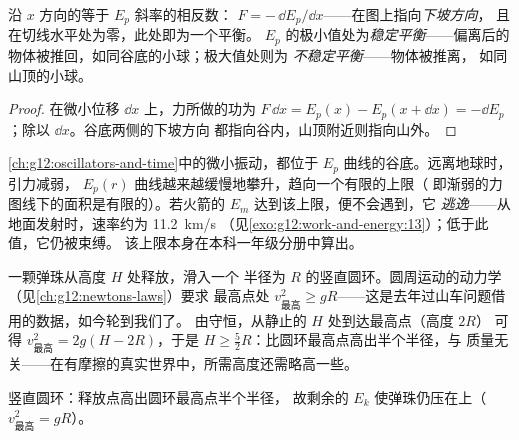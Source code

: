 \begin{proposition}[由势能曲线得力；平衡]\label{prop:g12:work-and-energy:equilibria}
沿 $x$ 方向的等于 $E_p$ 斜率的相反数：
$F = -\,\dd E_p/\dd x$——在图上指向\emph{下坡方向}，
且在切线水平处为零，此处即为一个平衡。
$E_p$ 的极小值处为\emph{稳定平衡}——偏离后的
物体被推回，如同谷底的小球；极大值处则为
\emph{不稳定平衡}——物体被推离，
如同山顶的小球。
\end{proposition}

\begin{proof}
在微小位移 $\dd x$ 上，力所做的功为 $F\,\dd x = E_p(x) -
E_p(x + \dd x) = -\dd E_p$；除以 $\dd x$。谷底两侧的下坡方向
都指向谷内，山顶附近则指向山外。
\end{proof}

\begin{remark}[振动与逃逸]\label{rem:g12:work-and-energy:escape}
\cref{ch:g12:oscillators-and-time}中的微小振动，都位于
$E_p$ 曲线的谷底。远离地球时，引力减弱，
$E_p(r)$ 曲线越来越缓慢地攀升，趋向一个有限的上限（
即渐弱的力图线下的面积是有限的）。若火箭的 $E_m$
达到该上限，便不会遇到，它
\emph{逃逸}——从地面发射时，速率约为 \qty{11.2}{km/s}
（见\cref{exo:g12:work-and-energy:13}）；低于此值，它仍被束缚。
该上限本身在本科一年级分册中算出。
\end{remark}

\begin{example}[竖直圆环]\label{ex:g12:work-and-energy:loop}
一颗弹珠从高度 $H$ 处释放，滑入一个
半径为 $R$ 的竖直圆环。圆周运动的动力学（见\cref{ch:g12:newtons-laws}）要求
最高点处 $v_{\text{最高}}^2 \geq gR$——这是去年过山车问题借用的数据，如今轮到我们了。
由守恒，从静止的 $H$ 处到达最高点（高度 $2R$）
可得 $v_{\text{最高}}^2 = 2g(H - 2R)$，于是
$H \geq \tfrac52 R$：比圆环最高点高出半个半径，与
质量无关——在有摩擦的真实世界中，所需高度还需略高一些。
\end{example}

\begin{omfigure}

{\small 竖直圆环：释放点高出圆环最高点半个半径，
故剩余的 $E_k$ 使弹珠仍压在上（$v_{\text{最高}}^2 = gR$）。}
\end{omfigure}

